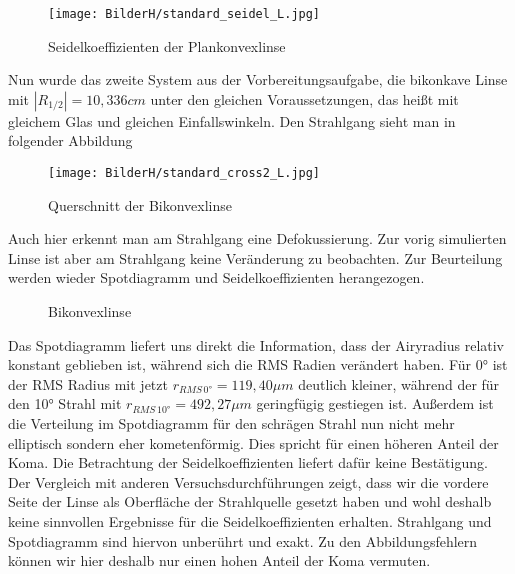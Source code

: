 \documentclass[twoside,colorback,accentcolor=tud4c,11pt]{tudreport}
\begin{document}
\begin{figure}[H]
\centering
   	\begin{minipage}[b]{\textwidth}
\centering   	\texttt{[image: BilderH/standard\_seidel\_L.jpg]}
   	\caption{Seidelkoeffizienten der Plankonvexlinse}
  	\end{minipage}
\end{figure}
	
	Nun wurde das zweite System aus der Vorbereitungsaufgabe, die bikonkave Linse mit $|R_{1/2}| = 10,336 cm$ unter den gleichen Voraussetzungen, das heißt mit gleichem Glas und gleichen Einfallswinkeln. Den Strahlgang sieht man in folgender Abbildung 
	
	\begin{figure}[H]
\centering
   	\begin{minipage}[b]{\textwidth}
\centering   	\texttt{[image: BilderH/standard\_cross2\_L.jpg]}
   	\caption{Querschnitt der Bikonvexlinse}
  	\end{minipage}
\end{figure}
	
	Auch hier erkennt man am Strahlgang eine Defokussierung. Zur vorig simulierten Linse ist aber am Strahlgang keine Veränderung zu beobachten. Zur Beurteilung werden wieder Spotdiagramm und Seidelkoeffizienten herangezogen.
	
	\begin{figure}[H]
\centering
  \quad
  \quad   
  \caption{Bikonvexlinse}
\end{figure}
	
	Das Spotdiagramm liefert uns direkt die Information, dass der Airyradius relativ konstant geblieben ist, während sich die RMS Radien verändert haben. Für 0° ist der RMS Radius mit jetzt $r_{RMS \, 0°} = 119,40 \mu m $ deutlich kleiner, während der für den 10° Strahl mit $r_{RMS \, 10°} = 492,27 \mu m$ geringfügig gestiegen ist. Außerdem ist die Verteilung im Spotdiagramm für den schrägen Strahl nun nicht mehr elliptisch sondern eher kometenförmig. Dies spricht für einen höheren Anteil der Koma. Die Betrachtung der Seidelkoeffizienten liefert dafür keine Bestätigung. Der Vergleich mit anderen Versuchsdurchführungen zeigt, dass wir die vordere Seite der Linse als Oberfläche der Strahlquelle gesetzt haben und wohl deshalb keine sinnvollen Ergebnisse für die Seidelkoeffizienten erhalten. Strahlgang und Spotdiagramm sind hiervon unberührt und exakt. 
	Zu den Abbildungsfehlern können wir hier deshalb nur einen hohen Anteil der Koma vermuten.
	
\end{document}
